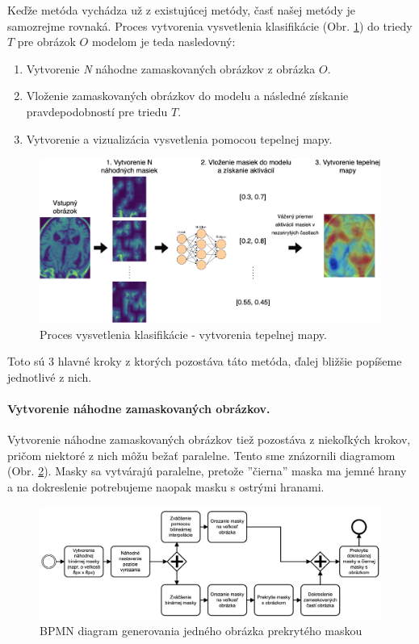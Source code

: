 Keďže metóda vychádza už z existujúcej metódy, časť našej metódy je samozrejme rovnaká. Proces vytvorenia vysvetlenia klasifikácie (Obr. \ref{fig:risei_heatmap_generation}) do triedy $T$ pre obrázok $O$ modelom je teda nasledovný:

\begin{enumerate}
    \item Vytvorenie \textit{N} náhodne zamaskovaných obrázkov z obrázka $O$.
    \item Vloženie zamaskovaných obrázkov do modelu a následné získanie pravdepodobností pre triedu $T$.
    \item Vytvorenie a vizualizácia vysvetlenia pomocou tepelnej mapy.
\end{enumerate}

\begin{figure}[h!]
    \centering
    \includegraphics[scale=0.35]{assets/images/risei_heatmap_generation.png}
    \caption{Proces vysvetlenia klasifikácie - vytvorenia tepelnej mapy.}
    \label{fig:risei_heatmap_generation}
\end{figure}

Toto sú 3 hlavné kroky z ktorých pozostáva táto metóda, ďalej bližšie popíšeme jednotlivé z nich.

\paragraph{Vytvorenie náhodne zamaskovaných obrázkov.}

Vytvorenie náhodne zamaskovaných obrázkov tiež pozostáva z niekoľkých krokov, pričom niektoré z nich môžu bežať paralelne. Tento sme znázornili diagramom (Obr. \ref{fig:risei_diagram}). Masky sa vytvárajú paralelne, pretože ''čierna'' maska ma jemné hrany a na dokreslenie potrebujeme naopak masku s ostrými hranami.

\begin{figure}[h!]
    \centering
    \includegraphics[scale=0.45]{assets/images/risei_diagram.png}
    \caption{BPMN diagram generovania jedného obrázka prekrytého maskou}
    \label{fig:risei_diagram}
\end{figure}

